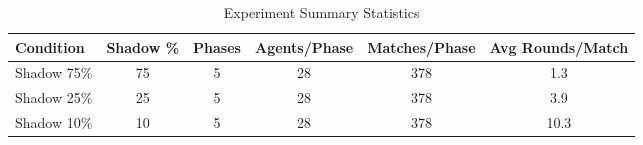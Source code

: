 \begin{table}[htbp]
\centering
\footnotesize
\caption{Experiment Summary Statistics}
\label{tab:experiment_summary}
\begin{tabular}{|l|c|c|c|c|c|}
\hline
\textbf{Condition} & \textbf{Shadow \%} & \textbf{Phases} & \textbf{Agents/Phase} & \textbf{Matches/Phase} & \textbf{Avg Rounds/Match} \\
\hline
Shadow 75\% & 75 & 5 & 28 & 378 & 1.3 \\
Shadow 25\% & 25 & 5 & 28 & 378 & 3.9 \\
Shadow 10\% & 10 & 5 & 28 & 378 & 10.3 \\
\hline
\end{tabular}
\end{table}



